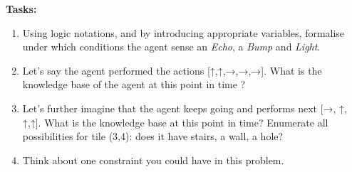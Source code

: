\documentclass[11pt]{article}
\numberwithin{equation}{section}
\newcommand{\sol}[1]{
    }
\begin{document}
\textbf{Tasks:}
\begin{enumerate}
    \item Using logic notations, and by introducing appropriate variables, formalise under which conditions the agent sense an \emph{Echo}, a \emph{Bump} and \emph{Light}.
    \item Let's say the agent performed the actions [↑,↑,→,→,→]. What is the knowledge base of the agent at this point in time ? 
    
    \sol{
        \paragraph{Knowledge Base}
        \begin{enumerate}
        \item We bumped into a wall after the second action, thus, there is a wall at (0, 2). This also means that we walked the following path: [(0,0), (0,1), (1,1), (2,1), (3,1)].
        \item There were no light at (0,0), (0,1), (1,1), (2,1), thus, $y_S \centernot \in \{0,1,2\}$ and  $x_S \centernot \in \{0, 1\}$.
        \item There were light at (3,1), it could either mean that $x_S =3$ or that $y_S=1$. However, knowing that $y_S \centernot\in \{0, 1\}$, it implies that $x_S=3$.
        \item Upon reaching tile (3,1), we heard an echo. This means that there is a hole either in (3,2), (4,1) or (3,0). (2,1) is not an option since we walked on that tile. 
        (4,1) is not an option either since the hole must be on the same row or column than the stairs, but $x_S\neq 4$ and $y_S \neq 1$.
        \end{enumerate}
    }

    \item Let's further imagine that the agent keeps going and performs next [→, ↑, ↑,↑]. What is the knowledge base at this point in time? Enumerate all possibilities for tile (3,4): does it have stairs, a wall, a hole?
    \item Think about one constraint you could have in this problem. 
\end{enumerate}
\end{document}
